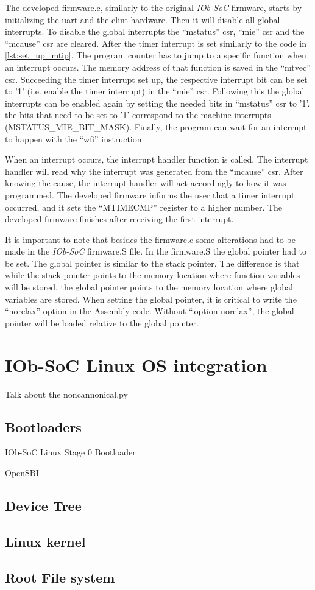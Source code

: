 The developed firmware.c, similarly to the original \textit{IOb-SoC} firmware, starts by initializing the \acrshort{uart} and the \acrshort{clint} hardware. Then it will disable all global interrupts. To disable the global interrupts the \enquote{mstatus} \acrshort{csr}, \enquote{mie} \acrshort{csr} and the \enquote{mcause} \acrshort{csr} are cleared. After the timer interrupt is set similarly to the code in \ref{lst:set_up_mtip}. The program counter has to jump to a specific function when an interrupt occurs. The memory address of that function is saved in the \enquote{mtvec} \acrshort{csr}. Succeeding the timer interrupt set up, the respective interrupt bit can be set to '1' (i.e. enable the timer interrupt) in the \enquote{mie} \acrshort{csr}. Following this the global interrupts can be enabled again by setting the needed bits in \enquote{mstatus} \acrshort{csr} to '1'. the bits that need to be set to '1' correspond to the machine interrupts (MSTATUS\_MIE\_BIT\_MASK). Finally, the program can wait for an interrupt to happen with the \enquote{wfi} instruction.

When an interrupt occurs, the interrupt handler function is called. The interrupt handler will read why the interrupt was generated from the \enquote{mcause} \acrshort{csr}. After knowing the cause, the interrupt handler will act accordingly to how it was programmed. The developed firmware informs the user that a timer interrupt occurred, and it sets the \enquote{MTIMECMP} register to a higher number. The developed firmware finishes after receiving the first interrupt.

It is important to note that besides the firmware.c some alterations had to be made in the \textit{IOb-SoC} firmware.S file. In the firmware.S the global pointer had to be set. The global pointer is similar to the stack pointer. The difference is that while the stack pointer points to the memory location where function variables will be stored, the global pointer points to the memory location where global variables are stored. When setting the global pointer, it is critical to write the \enquote{norelax} option in the Assembly code. Without \enquote{.option norelax}, the global pointer will be loaded relative to the global pointer.

\section{IOb-SoC Linux OS integration}
\label{section:linux_os_integration}
Talk about the noncannonical.py

\subsection{Bootloaders}
IOb-SoC Linux Stage 0 Bootloader

OpenSBI

\subsection{Device Tree}

\subsection{Linux kernel}

\subsection{Root File system}
